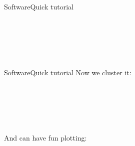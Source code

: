 \begin{frame}{Software}{Quick tutorial}
{		\hlstd{}\hlstd{\ \ \ \ }\hlstd{}\hlopt{\},}\hspace*{\fill}\\
		\hlstd{}\hlstd{\ \ \ \ }\hlopt{=}\hlstd{}\hlstd{}\hlopt{,}\hspace*{\fill}\\
		\hlstd{}\hlstd{\ \ \ \ }\hlopt{=}\hlstd{}\hlstd{}\hlopt{,}\hspace*{\fill}\\
		\hlstd{}\hlstd{\ \ \ \ }\hlopt{=}\hlstd{}\hlstd{}\hspace*{\fill}\\
		\hlopt{)}\hspace*{\fill}\\
		\hlstd{}\hlstd{}\hlopt{()}\hspace*{\fill}
		\hlstd{}\hlstd{}\hlopt{(}\hlstd{}\hlstd{}\hlopt{,\ }\hlstd{}\hlstd{}\hlopt{)}\hlstd{}\hspace*{\fill}\\
		\mbox{}
		\normalfont
		\normalsize
	}
\end{frame}


\begin{frame}{Software}{Quick tutorial}
	Now we cluster it: \\[2ex]
	
	{
		\noindent
		\ttfamily
		\hlopt{=\ }\hlstd{}\hlstd{}\hlopt{(}\hlstd{}\hlstd{}\hlopt{,\ }\hlstd{}\hlstd{}\hlopt{)}\hspace*{\fill}\\
		\hlstd{}\hlstd{}\hlopt{()}\hspace*{\fill}\\
		\hlstd{}\hlstd{}\hlopt{(}\hlopt{=}\hlstd{}\hlstd{}\hlopt{)}\hspace*{\fill}\\
		\hlstd{}\hspace*{\fill}\\
		\hspace*{\fill}\\
		\mbox{}
		\normalfont
		\normalsize
	}
	
	And can have fun plotting: \\[2ex]
\end{frame}